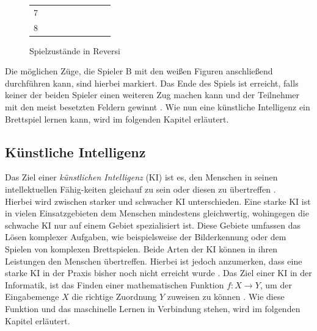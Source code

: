 \documentclass[12pt,a4paper,bibliography=totocnumbered,listof=totocnumbered]{article}
\begin{document}
\begin{figure} [h]
\begin{minipage}[b]{0.45\textwidth}
\begin{tabular}{m{0.2cm}m{0.2cm}m{0.2cm}m{0.2cm}m{0.2cm}m{0.2cm}m{0.2cm}m{0.2cm}m{0.2cm}}
\multicolumn{1}{l|}{7} & \multicolumn{1}{l|}{} & \multicolumn{1}{l|}{} & \multicolumn{1}{l|}{} & \multicolumn{1}{l|}{}                         & \multicolumn{1}{l|}{}  & \multicolumn{1}{l|}{}                         & \multicolumn{1}{l|}{} & \multicolumn{1}{l|}{} \\ \cline{2-9} 
\multicolumn{1}{l|}{8} & \multicolumn{1}{l|}{} & \multicolumn{1}{l|}{} & \multicolumn{1}{l|}{} & \multicolumn{1}{l|}{}                         & \multicolumn{1}{l|}{}  & \multicolumn{1}{l|}{}                         & \multicolumn{1}{l|}{} & \multicolumn{1}{l|}{} \\ \cline{2-9} 
\end{tabular}
    \label{abb:reversi-zug}

\end{minipage}
\caption{Spielzustände in Reversi}

\label{abb:reversi}
\end{figure}

Die möglichen Züge, die Spieler B mit den weißen Figuren anschließend durchführen kann, sind hierbei markiert. Das Ende des Spiels ist erreicht, falls keiner der beiden Spieler einen weiteren Zug machen kann und der Teilnehmer mit den meist besetzten Feldern gewinnt \citep{NikLever.2012}. Wie nun eine künstliche Intelligenz ein Brettspiel lernen kann, wird im folgenden Kapitel erläutert.

\subsection{Künstliche Intelligenz}
Das Ziel einer \emph{künstlichen Intelligenz} (KI) ist es, den Menschen in seinen intellektuellen Fähig-keiten gleichauf zu sein oder diesen zu übertreffen \citep[S. 14]{Frochte.2019}.\\
Hierbei wird zwischen starker und schwacher KI unterschieden. Eine starke KI ist in vielen Einsatzgebieten dem Menschen mindestens gleichwertig, wohingegen die schwache KI nur auf einem Gebiet spezialisiert ist. Diese Gebiete umfassen das Lösen komplexer Aufgaben, wie beispielsweise der Bilderkennung oder dem Spielen von komplexen Brettspielen. Beide Arten der KI können in ihren Leistungen den Menschen übertreffen. Hierbei ist jedoch anzumerken, dass eine starke KI in der Praxis bisher noch nicht erreicht wurde \citep[S.21]{UweLammel.2020}. Das Ziel einer KI in der Informatik, ist das Finden einer mathematischen Funktion $f: X \rightarrow Y$, um der Eingabemenge $X$ die richtige Zuordnung $Y$ zuweisen zu können \citep[S.20]{Frochte.2019}. Wie diese Funktion und das maschinelle Lernen in Verbindung stehen, wird im folgenden Kapitel erläutert.
\end{document}
